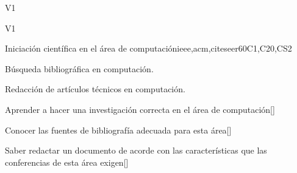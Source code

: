 \begin{syllabus}
\begin{outcomes}{V1}
  \item {}
  \item {}
  \item {}
  \item {}
  \item {}
  \item {}
  \item {}
  \item {}
\end{outcomes}
\begin{competences}{V1}
    \item {} 
    \item {}
    \item {}
\end{competences}

\begin{unit}{}{Iniciación científica en el área de computación}{ieee,acm,citeseer}{60}{C1,C20,CS2}
  \begin{topics}
      \item Búsqueda bibliográfica en computación.
      \item Redacción de artículos técnicos en computación.
  \end{topics}
  \begin{learningoutcomes}
      \item Aprender a hacer una investigación correcta en el área de computación[\Usage]
      \item Conocer las fuentes de bibliografía adecuada para esta área[\Usage]
      \item Saber redactar un documento de acorde con las características que las conferencias de esta área exigen[\Usage]
  \end{learningoutcomes}
\end{unit}

\begin{coursebibliography}
\end{coursebibliography}

\end{syllabus}
